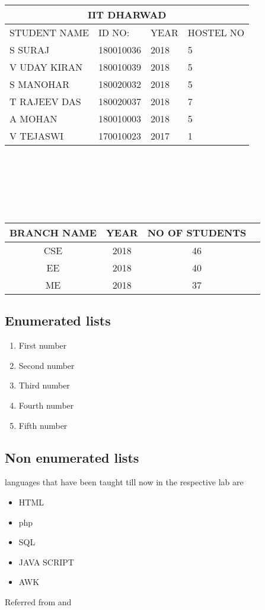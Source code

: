 \documentclass[12pt, letterpaper, twoside]{article}
\begin{document}
\begin{enumerate}[label=(\alph*)]
\begin{tabular}{ |p{4cm}||p{4cm}|p{4cm}|p{4cm}|  }
 \hline
 \multicolumn{4}{|c|}{\textbf{IIT DHARWAD}} \\
 \hline
STUDENT NAME &ID NO: &YEAR&HOSTEL NO\\
 \hline
 S SURAJ &180010036  & 2018   &5\\
 V  UDAY KIRAN   &180010039     &2018& 5\\
 S  MANOHAR &180020032 & 2018&  5\\
 T RAJEEV DAS &180020037 &2018 &7\\
 A MOHAN  &180010003 &2018 &5\\
 V  TEJASWI&  170010023  & 2017&1\\
 \hline
\end{tabular}\\\\\\\\\\


\begin{center}
\begin{tabular}{ |c|c|c|c| }
\hline
\textbf{BRANCH NAME} & \textbf{YEAR} & \textbf{NO OF STUDENTS} \\
\hline
CSE& 2018 & 46 \\
EE& 2018 & 40 \\
ME& 2018 & 37 \\
\hline
\end{tabular}
\end{center}
\subsection{Enumerated lists}
\begin{enumerate}
  \item First number
  \item Second number
  \item Third number
  \item Fourth number
  \item Fifth number
\end{enumerate}
\subsection{Non enumerated lists}
languages that have been taught till now in the respective lab are
 \begin{itemize}
  \item HTML
  \item php
  \item SQL
  \item JAVA SCRIPT
  \item AWK
\end{itemize}


Referred from \cite{Book1}
and \cite{Book2}



\end{enumerate}
 
\end{document}
